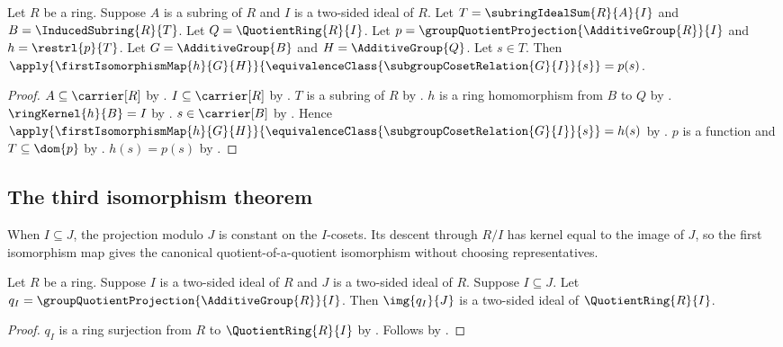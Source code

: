 \begin{proposition}\label{ring_second_isomorphism_image_form_apply}
    Let $R$ be a ring.
    Suppose $A$ is a subring of $R$ and
        $I$ is a two-sided ideal of $R$.
    Let $T=\subringIdealSum{R}{A}{I}$ and
        $B=\InducedSubring{R}{T}$.
    Let $Q=\QuotientRing{R}{I}$.
    Let $p=\groupQuotientProjection{\AdditiveGroup{R}}{I}$ and
        $h=\restrl{p}{T}$.
    Let $G=\AdditiveGroup{B}$ and $H=\AdditiveGroup{Q}$.
    Let $s\in T$.
    Then
        $\apply{\firstIsomorphismMap{h}{G}{H}}{
            \equivalenceClass{\subgroupCosetRelation{G}{I}}{s}}
        =p(s)$.
\end{proposition}
\begin{proof}
    $A\subseteq\carrier[R]$ by .
    $I\subseteq\carrier[R]$ by
        .
    $T$ is a subring of $R$ by .
    $h$ is a ring homomorphism from $B$ to $Q$ by
        .
    $\ringKernel{h}{B}=I$ by
        .
    $s\in\carrier[B]$ by .
    Hence
        $\apply{\firstIsomorphismMap{h}{G}{H}}{
            \equivalenceClass{\subgroupCosetRelation{G}{I}}{s}}
        =h(s)$ by .
    $p$ is a function and $T\subseteq\dom{p}$ by
        .
    $h(s)=p(s)$ by .
\end{proof}

\subsection{The third isomorphism theorem}

When $I\subseteq J$, the projection modulo $J$ is constant on the
$I$-cosets.  Its descent through $R/I$ has kernel equal to the image of $J$,
so the first isomorphism map gives the canonical quotient-of-a-quotient
isomorphism without choosing representatives.

\begin{theorem}\label{ring_third_isomorphism_image_ideal}
    Let $R$ be a ring.
    Suppose $I$ is a two-sided ideal of $R$ and
        $J$ is a two-sided ideal of $R$.
    Suppose $I\subseteq J$.
    Let $q_I=\groupQuotientProjection{\AdditiveGroup{R}}{I}$.
    Then $\img{q_I}{J}$ is a two-sided ideal of
        $\QuotientRing{R}{I}$.
\end{theorem}
\begin{proof}
    $q_I$ is a ring surjection from $R$ to $\QuotientRing{R}{I}$ by
        .
    Follows by .
\end{proof}

